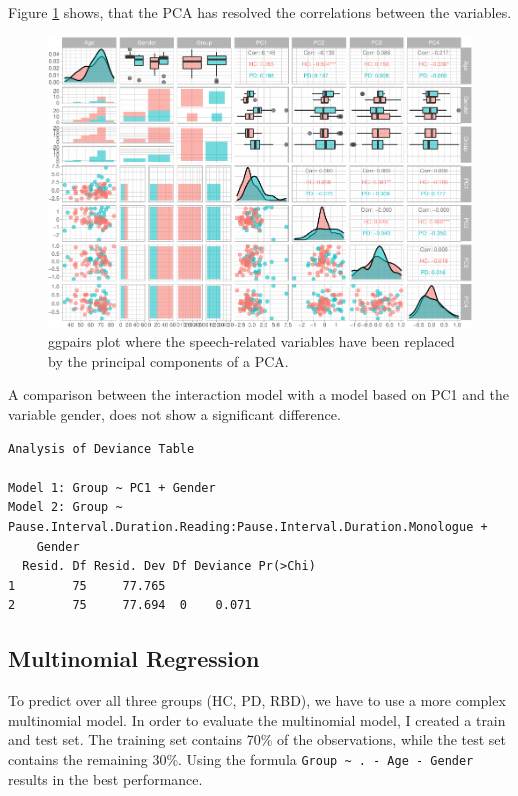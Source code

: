 \documentclass[
  english,
  doc,floatsintext]{apa6}
\begin{document}
Figure \ref{fig:pca-ggpairs} shows, that the PCA has resolved the correlations between the variables.

\begin{figure}
\centering
\includegraphics{dap_report_anja_probst_files/figure-latex/pca-ggpairs-1.pdf}
\caption{\label{fig:pca-ggpairs}ggpairs plot where the speech-related variables have been replaced by the principal components of a PCA.}
\end{figure}

A comparison between the interaction model with a model based on PC1 and the variable gender,
does not show a significant difference.

\begin{verbatim}
Analysis of Deviance Table

Model 1: Group ~ PC1 + Gender
Model 2: Group ~ Pause.Interval.Duration.Reading:Pause.Interval.Duration.Monologue + 
    Gender
  Resid. Df Resid. Dev Df Deviance Pr(>Chi)
1        75     77.765                     
2        75     77.694  0    0.071         
\end{verbatim}

\hypertarget{multinomial-regression}{%
\subsection{Multinomial Regression}\label{multinomial-regression}}

To predict over all three groups (HC, PD, RBD), we have to use a more complex
multinomial model. In order to evaluate the multinomial model, I created a train and test set. The training set contains 70\% of the observations, while the test set contains the
remaining 30\%.
Using the formula \texttt{Group\ \textasciitilde{}\ .\ -\ Age\ -\ Gender} results in the best performance.
\end{document}
